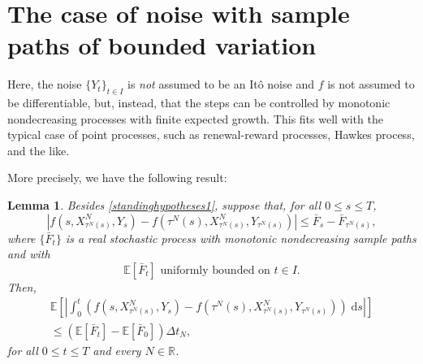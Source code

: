 \documentclass[reqno,12pt]{amsart}
\theoremstyle{plain}%
\newtheorem{lem}{Lemma}[section]
\theoremstyle{definition}
\begin{document}
\section{The case of noise with sample paths of bounded variation}
\label{secmonotonicbound}

Here, the noise $\{Y_t\}_{t\in I}$ is \emph{not} assumed to be an It\^o noise and $f$ is not assumed to be differentiable, but, instead, that the steps can be controlled by monotonic nondecreasing processes with finite expected growth. This fits well with the typical case of point processes, such as renewal-reward processes, Hawkes process, and the like.

More precisely, we have the following result:

\begin{lem}
    \label{lemmonotonicbound}
    Besides \cref{standinghypotheses1}, suppose that, for all $0 \leq s \leq T$,
    \begin{equation}
        \label{stepbound}
          |f(s, X_{\tau^N(s)}^N, Y_s) - f({\tau^N(s)}, X_{\tau^N(s)}^N, Y_{\tau^N(s)})| \leq \bar F_s - \bar F_{\tau^N(s)},
      \end{equation}
      where $\{\bar F_t\}$ is a real stochastic process with monotonic nondecreasing sample paths and with
      \begin{equation}
        \label{expectstepmonotonic}
        \mathbb{E}[\bar F_t] \textrm{ uniformly bounded on } t\in I.
      \end{equation}
      Then,
      \begin{multline}
        \label{expectintfboundbyG}
          \mathbb{E}\left[\left|\int_0^t \left( f(s, X_{\tau^N(s)}^N, Y_s) - f(\tau^N(s), X_{\tau^N(s)}^N, Y_{\tau^N(s)}) \right)\;\mathrm{d}s\right|\right] \\
          \leq (\mathbb{E}[\bar F_t] - \mathbb{E}[\bar F_0])\Delta t_N,
      \end{multline}
      for all $0 \leq t \leq T$ and every $N\in \mathbb{R}$.
\end{lem}
\end{document}
